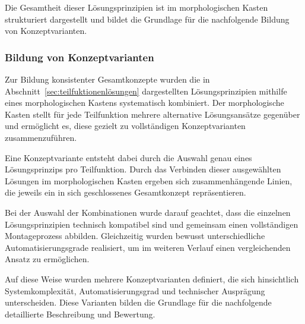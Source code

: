 Die Gesamtheit dieser Lösungsprinzipien ist im morphologischen Kasten strukturiert dargestellt und bildet die Grundlage für die nachfolgende Bildung von Konzeptvarianten.

\subsubsection{Bildung von Konzeptvarianten}
Zur Bildung konsistenter Gesamtkonzepte wurden die in Abschnitt~\ref{sec:teilfuktionenlösungen} dargestellten Lösungsprinzipien mithilfe eines morphologischen Kastens systematisch kombiniert. Der morphologische Kasten stellt für jede Teilfunktion mehrere alternative Lösungsansätze gegenüber und ermöglicht es, diese gezielt zu vollständigen Konzeptvarianten zusammenzuführen.

Eine Konzeptvariante entsteht dabei durch die Auswahl genau eines Lösungsprinzips pro Teilfunktion. Durch das Verbinden dieser ausgewählten Lösungen im morphologischen Kasten ergeben sich zusammenhängende Linien, die jeweils ein in sich geschlossenes Gesamtkonzept repräsentieren.

Bei der Auswahl der Kombinationen wurde darauf geachtet, dass die einzelnen Lösungsprinzipien technisch kompatibel sind und gemeinsam einen vollständigen Montageprozess abbilden. Gleichzeitig wurden bewusst unterschiedliche Automatisierungsgrade realisiert, um im weiteren Verlauf einen vergleichenden Ansatz zu ermöglichen.

Auf diese Weise wurden mehrere Konzeptvarianten definiert, die sich hinsichtlich Systemkomplexität, Automatisierungsgrad und technischer Ausprägung unterscheiden. Diese Varianten bilden die Grundlage für die nachfolgende detaillierte Beschreibung und Bewertung.
\\\\\\\\

